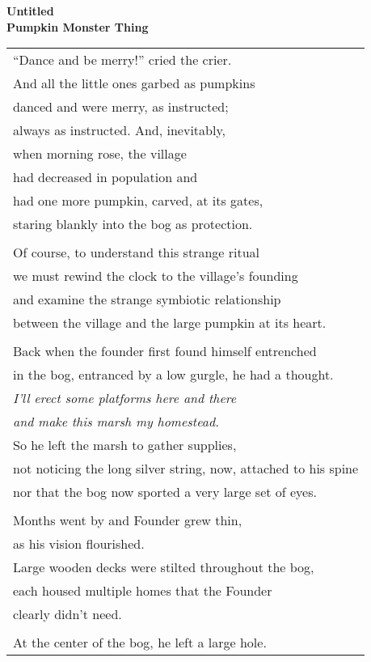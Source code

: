 \documentclass{article}
\begin{document}
\newcommand{\h}{\hspace*{4ex}}

\begin{center}
\textbf{Untitled} \\ %
{\small\textbf{Pumpkin Monster Thing}} \\
\vspace*{2ex}
\begin{tabular}{l}
``Dance and be merry!'' cried the crier. \\
And all the little ones garbed as pumpkins \\
danced and were merry, as instructed; \\
always as instructed. And, inevitably, \\
when morning rose, the village \\
had decreased in population and \\
had one more pumpkin, carved, at its gates, \\
staring blankly into the bog as protection. \\
\\
Of course, to understand this strange ritual \\
we must rewind the clock to the village's founding \\
and examine the strange symbiotic relationship \\
between the village and the large pumpkin at its heart. \\
\\
Back when the founder first found himself entrenched \\
in the bog, entranced by a low gurgle, he had a thought. \\
\h \textit{I'll erect some platforms here and there} \\
\h \textit{and make this marsh my homestead.} \\
So he left the marsh to gather supplies, \\
not noticing the long silver string, now, attached to his spine \\
nor that the bog now sported a very large set of eyes. \\
\\
Months went by and Founder grew thin, \\
as his vision flourished. \\
Large wooden decks were stilted throughout the bog, \\
each housed multiple homes that the Founder \\
clearly didn't need. \\
\\
At the center of the bog, he left a large hole. \\
\end{tabular}
\end{center}
\end{document}
